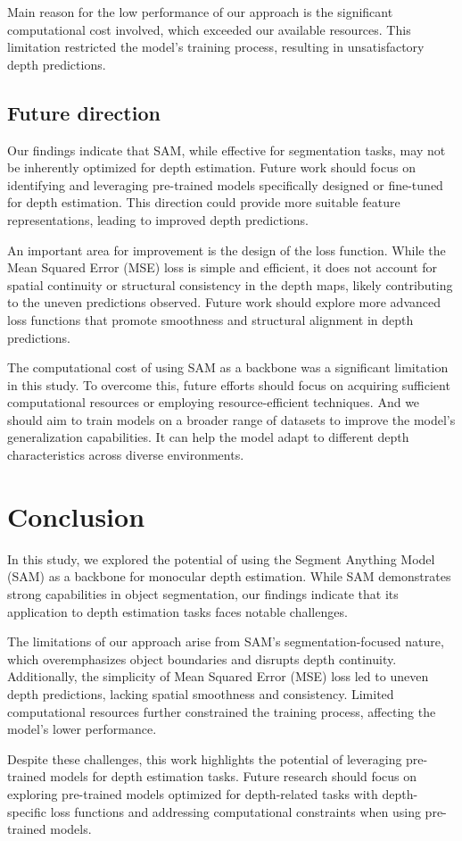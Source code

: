 \documentclass{article}
\begin{document}
Main reason for the low performance of our approach is the significant computational cost involved, which exceeded our available resources. This limitation restricted the model's training process, resulting in unsatisfactory depth predictions.

\subsection{Future direction}

Our findings indicate that SAM, while effective for segmentation tasks, may not be inherently optimized for depth estimation. Future work should focus on identifying and leveraging pre-trained models specifically designed or fine-tuned for depth estimation. This direction could provide more suitable feature representations, leading to improved depth predictions.

An important area for improvement is the design of the loss function. While the Mean Squared Error (MSE) loss is simple and efficient, it does not account for spatial continuity or structural consistency in the depth maps, likely contributing to the uneven predictions observed. Future work should explore more advanced loss functions that promote smoothness and structural alignment in depth predictions.

The computational cost of using SAM as a backbone was a significant limitation in this study. To overcome this, future efforts should focus on acquiring sufficient computational resources or employing resource-efficient techniques. And we should aim to train models on a broader range of datasets to improve the model's generalization capabilities. It can help the model adapt to different depth characteristics across diverse environments. 

\section{Conclusion}

In this study, we explored the potential of using the Segment Anything Model (SAM) as a backbone for monocular depth estimation. While SAM demonstrates strong capabilities in object segmentation, our findings indicate that its application to depth estimation tasks faces notable challenges. 

The limitations of our approach arise from SAM's segmentation-focused nature, which overemphasizes object boundaries and disrupts depth continuity. Additionally, the simplicity of Mean Squared Error (MSE) loss led to uneven depth predictions, lacking spatial smoothness and consistency. Limited computational resources further constrained the training process, affecting the model's lower performance.

Despite these challenges, this work highlights the potential of leveraging pre-trained models for depth estimation tasks. Future research should focus on exploring pre-trained models optimized for depth-related tasks with depth-specific loss functions and addressing computational constraints when using pre-trained models.



\clearpage
\end{document}
